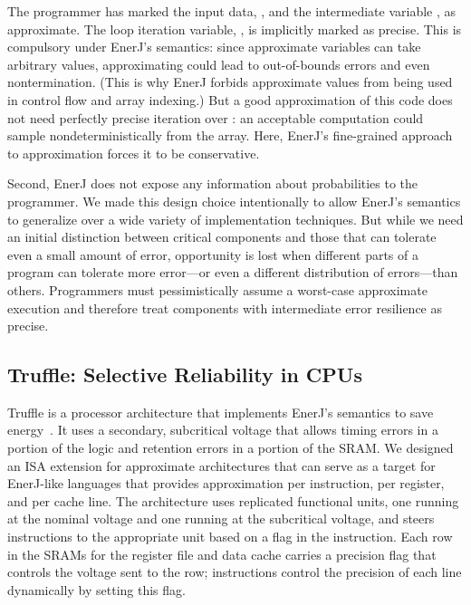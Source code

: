The programmer has marked the input data, , and the intermediate
variable , as approximate.
The loop iteration variable, , is implicitly marked as precise. This
is compulsory under EnerJ's semantics: since approximate variables can take
arbitrary values, approximating  could lead to out-of-bounds errors
and even nontermination. (This is why EnerJ forbids approximate values from
being used in control flow and array indexing.) But a good approximation
of this code does not need perfectly precise iteration over : an
acceptable computation could sample nondeterministically from the array.
Here, EnerJ's fine-grained approach to approximation forces it to be
conservative.

Second, EnerJ does not expose any information about probabilities to the
programmer. We made this design choice intentionally to allow EnerJ's
semantics to generalize over a wide variety of implementation techniques. But
while we need an initial distinction between critical components and those
that can tolerate even a small amount of error, opportunity is lost when
different parts of a program can tolerate more error---or even a different
distribution of errors---than others. Programmers must pessimistically
assume a worst-case approximate execution and therefore treat components with
intermediate error resilience as precise.

\subsection{Truffle: Selective Reliability in CPUs}

Truffle is a processor architecture that implements EnerJ's semantics to save
energy~\cite{truffle}. It uses a secondary, subcritical voltage that allows timing errors in
a portion of the logic and retention errors in a portion of the SRAM.
We
designed an ISA extension for approximate architectures that can serve as a
target for EnerJ-like languages that provides approximation per instruction,
per register, and per cache line.
The architecture uses replicated functional units, one running at the nominal
voltage and one running at the subcritical voltage, and steers instructions to the
appropriate unit based on a flag in the instruction. Each row in the SRAMs for
the register file and data cache carries a precision flag that controls the
voltage sent to the row; instructions control the precision of each line
dynamically by setting this flag.

